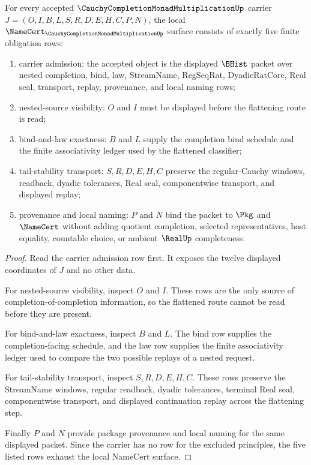 \begin{theorem}
\label{thm:cauchy-completion-monad-multiplication-namecert-obligation}
For every accepted $\CauchyCompletionMonadMultiplicationUp$ carrier $J=(O,I,B,L,S,R,D,E,H,C,P,N)$, the local $\NameCert_{\CauchyCompletionMonadMultiplicationUp}$ surface consists of exactly five finite obligation rows:
\begin{enumerate}
\item carrier admission: the accepted object is the displayed $\BHist$ packet over nested completion, bind, law, StreamName, RegSeqRat, DyadicRatCore, Real seal, transport, replay, provenance, and local naming rows;
\item nested-source visibility: $O$ and $I$ must be displayed before the flattening route is read;
\item bind-and-law exactness: $B$ and $L$ supply the completion bind schedule and the finite associativity ledger used by the flattened classifier;
\item tail-stability transport: $S,R,D,E,H,C$ preserve the regular-Cauchy windows, readback, dyadic tolerances, Real seal, componentwise transport, and displayed replay;
\item provenance and local naming: $P$ and $N$ bind the packet to $\Pkg$ and $\NameCert$ without adding quotient completion, selected representatives, host equality, countable choice, or ambient $\RealUp$ completeness.
\end{enumerate}
\end{theorem}
\begin{proof}
Read the carrier admission row first. It exposes the twelve displayed coordinates of $J$ and no other data.

For nested-source visibility, inspect $O$ and $I$. These rows are the only source of completion-of-completion information, so the flattened route cannot be read before they are present.

For bind-and-law exactness, inspect $B$ and $L$. The bind row supplies the completion-facing schedule, and the law row supplies the finite associativity ledger used to compare the two possible replays of a nested request.

For tail-stability transport, inspect $S,R,D,E,H,C$. These rows preserve the StreamName windows, regular readback, dyadic tolerances, terminal Real seal, componentwise transport, and displayed continuation replay across the flattening step.

Finally $P$ and $N$ provide package provenance and local naming for the same displayed packet. Since the carrier has no row for the excluded principles, the five listed rows exhaust the local NameCert surface.
\end{proof}

